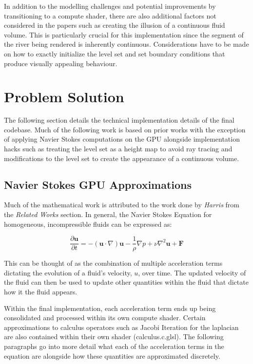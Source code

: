 \documentclass[conference]{IEEEtran}
\begin{document}
In addition to the modelling challenges and potential improvements by transitioning to a compute shader, there are also additional factors not considered in the papers such as creating the illusion of a continuous fluid volume. This is particularly crucial for this implementation since the segment of the river being rendered is inherently continuous. Considerations have to be made on how to exactly initialize the level set and set boundary conditions that produce visually appealing behaviour.

\section{Problem Solution}

The following section details the technical implementation details of the final codebase. Much of the following work is based on prior works with the exception of applying Navier Stokes computations on the GPU alongside implementation hacks such as treating the level set as a height map to avoid ray tracing and modifications to the level set to create the appearance of a continuous volume.

\subsection{Navier Stokes GPU Approximations}

Much of the mathematical work is attributed to the work done by \textit{Harris} from the \textit{Related Works} section. In general, the Navier Stokes Equation for homogeneous, incompressible fluids can be expressed as:

\begin{equation}
	\frac{\partial \mathbf{u}}{\partial t}=-(\mathbf{u} \cdot \nabla) \mathbf{u}-\frac{1}{\rho} \nabla p+\nu \nabla^{2} \mathbf{u}+\mathbf{F}
\end{equation}

This can be thought of as the combination of multiple acceleration terms dictating the evolution of a fluid's velocity, $u$, over time. The updated velocity of the fluid can then be used to update other quantities within the fluid that dictate how it the fluid appears.

Within the final implementation, each acceleration term ends up being consolidated and processed within its own compute shader. Certain approximations to calculus operators such as Jacobi Iteration for the laplacian are also contained within their own shader (calculus.c.glsl). The following paragraphs go into more detail what each of the acceleration terms in the equation are alongside how these quantities are approximated discretely.
\end{document}
